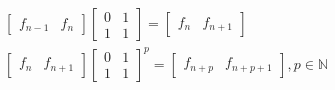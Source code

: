 \[
      \begin{array}{l}
            \begin{bmatrix} f_{n-1} & f_n \end{bmatrix}
            \begin{bmatrix} 0 & 1 \\ 1 & 1 \end{bmatrix} =
            \begin{bmatrix} f_n & f_{n+1} \end{bmatrix} \\
            \begin{bmatrix} f_n & f_{n+1} \end{bmatrix}
            {\begin{bmatrix} 0 & 1 \\ 1 & 1 \end{bmatrix}}^p =
            \begin{bmatrix} f_{n+p} & f_{n+p+1} \end{bmatrix},
            p \in \mathbb{N}
      \end{array} 
\]